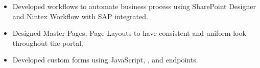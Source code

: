 \documentclass[10pt,a4paper]{altacv}
\begin{document}
\divider

\begin {itemize}
\item Developed workflows to automate business process using SharePoint Designer and Nintex Workflow with SAP integrated.
\item Designed Master Pages, Page Layouts to have consistent and uniform look throughout the portal.
\item  Developed custom forms using JavaScript, , and  endpoints. 
\end{itemize}





\clearpage
\end{document}
